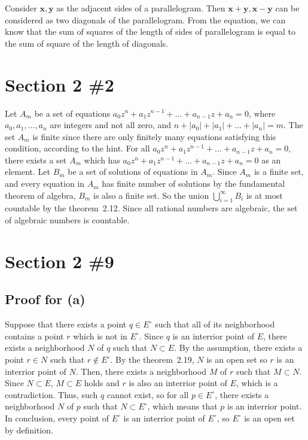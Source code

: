 \documentclass{scrartcl}
\begin{document}
Consider \(\mathbf{x}, \mathbf{y}\) as the adjacent sides of a parallelogram.
Then \(\mathbf{x + y}, \mathbf{x - y}\) can be considered as two diagonals of the parallelogram.
From the equation, we can know that the sum of squares of the length of sides of parallelogram is equal to the sum of square of the length of diagonals.

\section{Section 2 \#2}
Let \(A_m\) be a set of equations \(a_0 z^n + a_1 z^{n - 1} + \dots + a_{n - 1} z + a_n = 0\), where \(a_0, a_1, \dots, a_n\) are integers and not all zero, and \(n + |a_0| + |a_1| + \dots + |a_n| = m\).
The set \(A_m\) is finite since there are only finitely many equations satisfying this condition, according to the hint.
For all \(a_0 z^n + a_1 z^{n - 1} + \dots + a_{n - 1} z + a_n = 0\), there exists a set \(A_m\) which has \(a_0 z^n + a_1 z^{n - 1} + \dots + a_{n - 1} z + a_n = 0\) as an element.
Let \(B_m\) be a set of solutions of equations in \(A_m\).
Since \(A_m\) is a finite set, and every equation in \(A_m\) has finite number of solutions by the fundamental theorem of algebra, \(B_m\) is also a finite set.
So the union \(\bigcup_{i = 1}^\infty B_i\) is at most countable by the theorem~2.12.
Since all rational numbers are algebraic, the set of algebraic numbers is countable.

\section{Section 2 \#9}
\subsection{Proof for (a)}
Suppose that there exists a point \(q \in E^\circ\) such that all of its neighborhood contains a point \(r\) which is not in \(E^\circ\).
Since \(q\) is an interrior point of \(E\), there exists a neighborhood \(N\) of \(q\) such that \(N \subset E\).
By the assumption, there exists a point \(r \in N\) such that \(r \not \in E^\circ\).
By the theorem~2.19, \(N\) is an open set so \(r\) is an interrior point of \(N\).
Then, there exists a neighborhood \(M\) of \(r\) such that \(M \subset N\).
Since \(N \subset E\), \(M \subset E\) holds and \(r\) is also an interrior point of \(E\), which is a contradiction.
Thus, such \(q\) cannot exist, so for all \(p \in E^\circ\), there exists a neighborhood \(N\) of \(p\) such that \(N \subset E^\circ\), which means that \(p\) is an interrior point.
In conclusion, every point of \(E^\circ\) is an interrior point of \(E^\circ\), so \(E^\circ\) is an open set by definition.
\end{document}
